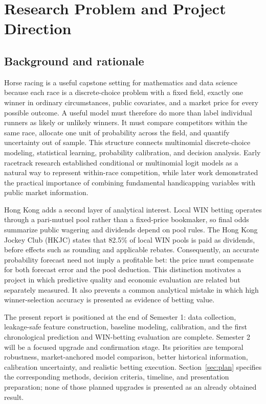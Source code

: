 \section{Research Problem and Project Direction}\label{sec:introduction}

\subsection{Background and rationale}\label{sec:background}
Horse racing is a useful capstone setting for mathematics and data science because each race is a discrete-choice problem with a fixed field, exactly one winner in ordinary circumstances, public covariates, and a market price for every possible outcome. A useful model must therefore do more than label individual runners as likely or unlikely winners. It must compare competitors within the same race, allocate one unit of probability across the field, and quantify uncertainty out of sample. This structure connects multinomial discrete-choice modeling, statistical learning, probability calibration, and decision analysis. Early racetrack research established conditional or multinomial logit models as a natural way to represent within-race competition, while later work demonstrated the practical importance of combining fundamental handicapping variables with public market information\cite{bolton1986,benter1994}.

Hong Kong adds a second layer of analytical interest. Local WIN betting operates through a pari-mutuel pool rather than a fixed-price bookmaker, so final odds summarize public wagering and dividends depend on pool rules. The Hong Kong Jockey Club (HKJC) states that 82.5\% of local WIN pools is paid as dividends, before effects such as rounding and applicable rebates\cite{hkjcguide}. Consequently, an accurate probability forecast need not imply a profitable bet: the price must compensate for both forecast error and the pool deduction. This distinction motivates a project in which predictive quality and economic evaluation are related but separately measured. It also prevents a common analytical mistake in which high winner-selection accuracy is presented as evidence of betting value.

The present report is positioned at the end of Semester 1: data collection, leakage-safe feature construction, baseline modeling, calibration, and the first chronological prediction and WIN-betting evaluation are complete. Semester 2 will be a focused upgrade and confirmation stage. Its priorities are temporal robustness, market-anchored model comparison, better historical information, calibration uncertainty, and realistic betting execution. Section~\ref{sec:plan} specifies the corresponding methods, decision criteria, timeline, and presentation preparation; none of those planned upgrades is presented as an already obtained result.

